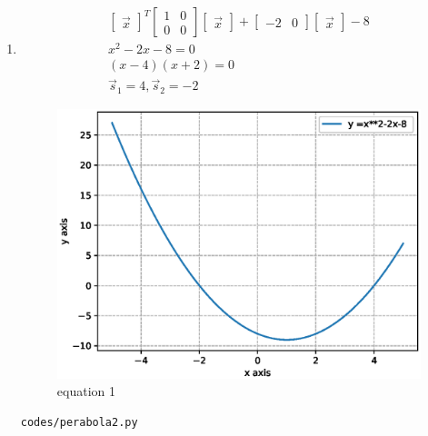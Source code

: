 \begin{enumerate}[label=\arabic*.,ref=\thesubsection.\theenumi]
\item
\begin{align}
\begin{bmatrix}\vec x\end{bmatrix}^T\begin{bmatrix}1 & 0\\0 & 0\end{bmatrix}\begin{bmatrix}\vec x\end{bmatrix} + \begin{bmatrix}-2 & 0\end{bmatrix}\begin{bmatrix}\vec x\end{bmatrix} -8
\\
x^2-2x-8 = 0
\\
\left(x-4\right)\left(x+2\right) = 0
\\
\vec s_1 = 4 ,\vec s_2 =-2 
\end{align}
\begin{figure}[!ht]
	\centering
	\includegraphics[width=\columnwidth]{./figures/perabola1.eps}
	\caption{equation 1 }
	\label{fig:perabola1}
\end{figure}
\begin{lstlisting}
codes/perabola2.py
\end{lstlisting}




\end{enumerate}
